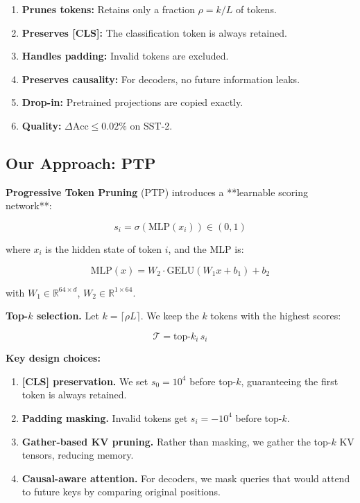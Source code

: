 {\begin{enumerate}
\item \textbf{Prunes tokens:} Retains only a fraction $\rho = k/L$ of tokens.
\item \textbf{Preserves [CLS]:} The classification token is always retained.
\item \textbf{Handles padding:} Invalid tokens are excluded.
\item \textbf{Preserves causality:} For decoders, no future information leaks.
\item \textbf{Drop-in:} Pretrained projections are copied exactly.
\item \textbf{Quality:} $\Delta\text{Acc} \leq 0.02\%$ on SST-2.

\end{enumerate}
\subsection{Our Approach: PTP}

\textbf{Progressive Token Pruning} (PTP) introduces a **learnable scoring 
network**:

\[
s_i = \sigma\left(\text{MLP}(x_i)\right) \in (0, 1)
\tag{1.1}
\]

where $x_i$ is the hidden state of token $i$, and the MLP is:

\[
\text{MLP}(x) = W_2 \cdot \text{GELU}(W_1 x + b_1) + b_2
\tag{1.2}
\]

with $W_1 \in \mathbb{R}^{64 \times d}$, $W_2 \in \mathbb{R}^{1 \times 64}$.

\textbf{Top-$k$ selection.} Let $k = \lceil \rho L \rceil$. We keep the $k$ 
tokens with the highest scores:

\[
\mathcal{T} = \text{top-}k_i \, s_i
\tag{1.3}
\]

\textbf{Key design choices:}

\begin{enumerate}
\item \textbf{[CLS] preservation.} We set $s_0 = 10^4$ before top-$k$, guaranteeing
  the first token is always retained.
\item \textbf{Padding masking.} Invalid tokens get $s_i = -10^4$ before top-$k$.
\item \textbf{Gather-based KV pruning.} Rather than masking, we gather the top-$k$
  KV tensors, reducing memory.
\item \textbf{Causal-aware attention.} For decoders, we mask queries that would
  attend to future keys by comparing original positions.


\end{enumerate}}
